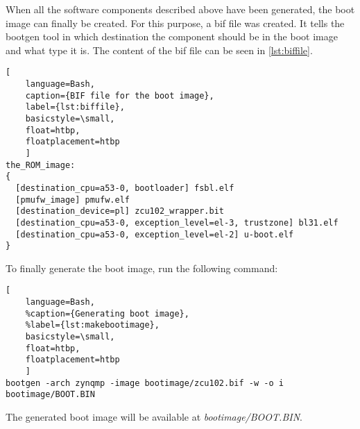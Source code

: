 When all the software components described above have been generated, the boot image can finally be created. For this purpose, a \gls{bif} file was created. It tells the bootgen tool in which destination the component should be in the boot image and what type it is. The content of the \gls{bif} file can be seen in \cref{lst:biffile}.
\begin{lstlisting}[
	language=Bash,
	caption={BIF file for the boot image},
	label={lst:biffile},
	basicstyle=\small,
	float=htbp,
	floatplacement=htbp
	]
the_ROM_image:
{
  [destination_cpu=a53-0, bootloader] fsbl.elf
  [pmufw_image] pmufw.elf
  [destination_device=pl] zcu102_wrapper.bit
  [destination_cpu=a53-0, exception_level=el-3, trustzone] bl31.elf
  [destination_cpu=a53-0, exception_level=el-2] u-boot.elf
}
\end{lstlisting}

To finally generate the boot image, run the following command:
\begin{lstlisting}[
	language=Bash,
	%caption={Generating boot image},
	%label={lst:makebootimage},
	basicstyle=\small,
	float=htbp,
	floatplacement=htbp
	]
bootgen -arch zynqmp -image bootimage/zcu102.bif -w -o i bootimage/BOOT.BIN
\end{lstlisting}
\FloatBarrier

The generated boot image will be available at \emph{bootimage/BOOT.BIN}.